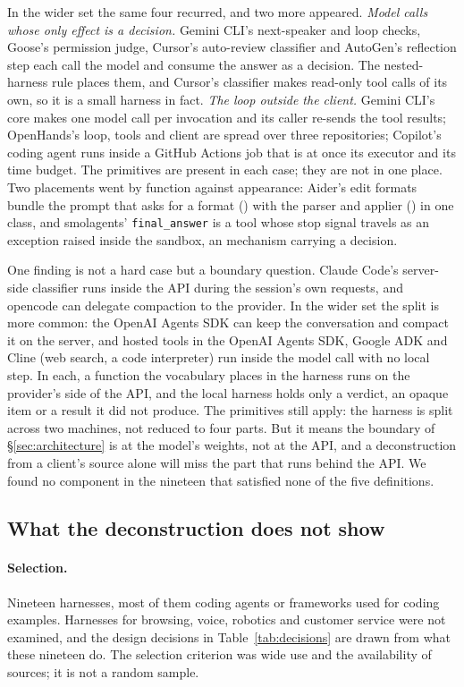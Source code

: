In the wider set the same four recurred, and two more appeared. \emph{Model calls whose only effect is a decision.} Gemini CLI's next-speaker and loop checks, Goose's permission judge, Cursor's auto-review classifier and AutoGen's reflection step each call the model and consume the answer as a  decision. The nested-harness rule places them, and Cursor's classifier makes read-only tool calls of its own, so it is a small harness in fact. \emph{The loop outside the client.} Gemini CLI's core makes one model call per invocation and its caller re-sends the tool results; OpenHands's loop, tools and client are spread over three repositories; Copilot's coding agent runs inside a GitHub Actions job that is at once its executor and its time budget. The primitives are present in each case; they are not in one place. Two placements went by function against appearance: Aider's edit formats bundle the prompt that asks for a format () with the parser and applier () in one class, and smolagents' \texttt{final\_answer} is a tool whose stop signal travels as an exception raised inside the sandbox, an  mechanism carrying a  decision.

One finding is not a hard case but a boundary question. Claude Code's server-side classifier runs inside the API during the session's own requests, and opencode can delegate compaction to the provider. In the wider set the split is more common: the OpenAI Agents SDK can keep the conversation and compact it on the server, and hosted tools in the OpenAI Agents SDK, Google ADK and Cline (web search, a code interpreter) run inside the model call with no local  step. In each, a function the vocabulary places in the harness runs on the provider's side of the API, and the local harness holds only a verdict, an opaque item or a result it did not produce. The primitives still apply: the harness is split across two machines, not reduced to four parts. But it means the boundary of \S\ref{sec:architecture} is at the model's weights, not at the API, and a deconstruction from a client's source alone will miss the part that runs behind the API. We found no component in the nineteen that satisfied none of the five definitions.

\subsection{What the deconstruction does not show}
\label{sec:notshown}
\paragraph{Selection.} Nineteen harnesses, most of them coding agents or frameworks used for coding examples. Harnesses for browsing, voice, robotics and customer service were not examined, and the design decisions in Table~\ref{tab:decisions} are drawn from what these nineteen do. The selection criterion was wide use and the availability of sources; it is not a random sample.
